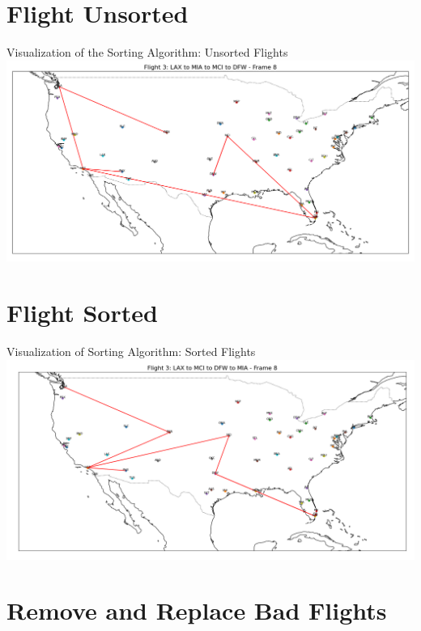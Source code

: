 \documentclass[aspectratio=169,xcolor=dvipsnames]{beamer}
\begin{document}
\section{Flight Unsorted}

\begin{frame}{Visualization of the Sorting Algorithm: Unsorted Flights}
    \includegraphics[width=\textwidth]{images/flights_unsort.png}
\end{frame}

\section{Flight Sorted}

\begin{frame}{Visualization of Sorting Algorithm: Sorted Flights}
    \includegraphics[width=\textwidth]{images/flight_sort.png}
\end{frame}

\section{Remove and Replace Bad Flights}
\end{document}
